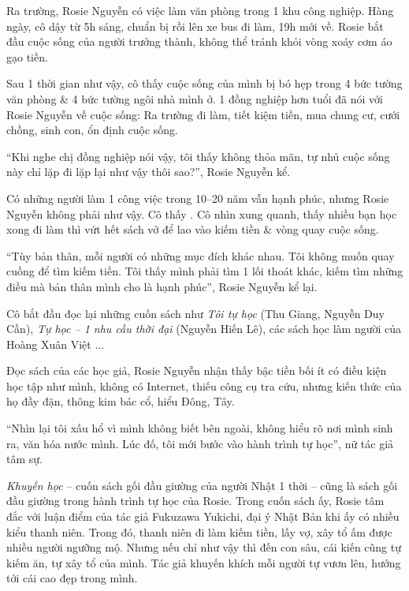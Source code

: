 \documentclass[oneside]{book}
\numberwithin{equation}{section}
\begin{document}
Ra trường, Rosie Nguyễn có việc làm văn phòng trong 1 khu công nghiệp. Hàng ngày, cô dậy từ 5h sáng, chuẩn bị rồi lên xe bus đi làm, 19h mới về. Rosie bắt đầu cuộc sống của người trưởng thành, không thể tránh khỏi vòng xoáy cơm áo gạo tiền.

Sau 1 thời gian như vậy, cô thấy cuộc sống của mình bị bó hẹp trong 4 bức tường văn phòng \& 4 bức tường ngôi nhà mình ở. 1 đồng nghiệp hơn tuổi đã nói với Rosie Nguyễn về cuộc sống: Ra trường đi làm, tiết kiệm tiền, mua chung cư, cưới chồng, sinh con, ổn định cuộc sống.

``Khi nghe chị đồng nghiệp nói vậy, tôi thấy không thỏa mãn, tự nhủ cuộc sống này chỉ lặp đi lặp lại như vậy thôi sao?'', Rosie Nguyễn kể.

Có những người làm 1 công việc trong 10--20 năm vẫn hạnh phúc, nhưng Rosie Nguyễn không phải như vậy. Cô thấy . Cô nhìn xung quanh, thấy nhiều bạn học xong đi làm thì vứt hết sách vở để lao vào kiếm tiền \& vòng quay cuộc sống.

``Tùy bản thân, mỗi người có những mục đích khác nhau. Tôi không muốn quay cuồng để tìm kiếm tiền. Tôi thấy mình phải tìm 1 lối thoát khác, kiếm tìm những điều mà bản thân mình cho là hạnh phúc'', Rosie Nguyễn kể lại.

Cô bắt đầu đọc lại những cuốn sách như \textit{Tôi tự học} (Thu Giang, Nguyễn Duy Cần), \textit{Tự học -- 1 nhu cầu thời đại} (Nguyễn Hiến Lê), các sách học làm người của Hoàng Xuân Việt $\ldots$

Đọc sách của các học giả, Rosie Nguyễn nhận thấy bậc tiền bối ít có điều kiện học tập như mình, không có Internet, thiếu công cụ tra cứu, nhưng kiến thức của họ đầy đặn, thông kim bác cổ, hiểu Đông, Tây.

``Nhìn lại tôi xấu hổ vì mình không biết bên ngoài, không hiểu rõ nơi mình sinh ra, văn hóa nước mình. Lúc đố, tôi mới bước vào hành trình tự học'', nữ tác giả tâm sự.

\textit{Khuyến học} -- cuốn sách gối đầu giường của người Nhật 1 thời -- cũng là sách gối đầu giường trong hành trình tự học của Rosie. Trong cuốn sách ấy, Rosie tâm đắc với luận điểm của tác giả Fukuzawa Yukichi, đại ý Nhật Bản khi ấy có nhiều kiểu thanh niên. Trong đó, thanh niên đi làm kiếm tiền, lấy vợ, xây tổ ấm được nhiều người ngưỡng mộ. Nhưng nếu chỉ như vậy thì đến con sâu, cái kiến cũng tự kiếm ăn, tự xây tổ của mình. Tác giả khuyến khích mỗi người tự vươn lên, hướng tới cái cao đẹp trong mình.
\end{document}
